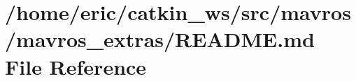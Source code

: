 \hypertarget{mavros_2mavros__extras_2README_8md}{}\section{/home/eric/catkin\+\_\+ws/src/mavros/mavros\+\_\+extras/\+R\+E\+A\+D\+ME.md File Reference}
\label{mavros_2mavros__extras_2README_8md}
